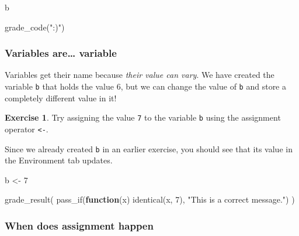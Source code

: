\documentclass[
]{article}
\newenvironment{Shaded}{\begin{snugshade}}{\end{snugshade}}
\newcommand{\ControlFlowTok}[1]{\textcolor[rgb]{0.13,0.29,0.53}{\textbf{#1}}}
\newcommand{\DecValTok}[1]{\textcolor[rgb]{0.00,0.00,0.81}{#1}}
\newcommand{\FunctionTok}[1]{\textcolor[rgb]{0.00,0.00,0.00}{#1}}
\newcommand{\NormalTok}[1]{#1}
\newcommand{\OtherTok}[1]{\textcolor[rgb]{0.56,0.35,0.01}{#1}}
\newcommand{\StringTok}[1]{\textcolor[rgb]{0.31,0.60,0.02}{#1}}
\theoremstyle{definition}
\theoremstyle{definition}
\theoremstyle{definition}
\newtheorem{exercise}{Exercise}[section]
\theoremstyle{definition}
\theoremstyle{remark}
\begin{document}
\begin{Shaded}
\begin{Highlighting}[]
\NormalTok{b}
\end{Highlighting}
\end{Shaded}

\begin{Shaded}
\begin{Highlighting}[]
\FunctionTok{grade\_code}\NormalTok{(}\StringTok{":)"}\NormalTok{)}
\end{Highlighting}
\end{Shaded}

\hypertarget{variables-are-variable}{%
\subsubsection{Variables are\ldots{} variable}\label{variables-are-variable}}

Variables get their name because \emph{their value can vary}. We have created the variable \texttt{b} that holds the value 6, but we can change the value of \texttt{b} and store a completely different value in it!

\begin{exercise}
Try assigning the value \texttt{7} to the variable \texttt{b} using the assignment operator \texttt{\textless{}-}.

Since we already created \texttt{b} in an earlier exercise, you should see that its value in the Environment tab updates.
\end{exercise}

\begin{Shaded}
\begin{Highlighting}[]
\NormalTok{b }\OtherTok{\textless{}{-}} \DecValTok{7}
\end{Highlighting}
\end{Shaded}

\begin{Shaded}
\begin{Highlighting}[]
\FunctionTok{grade\_result}\NormalTok{(}
  \FunctionTok{pass\_if}\NormalTok{(}\ControlFlowTok{function}\NormalTok{(x) }\FunctionTok{identical}\NormalTok{(x, }\DecValTok{7}\NormalTok{), }\StringTok{"This is a correct message."}\NormalTok{)}
\NormalTok{)}
\end{Highlighting}
\end{Shaded}

\hypertarget{when-does-assignment-happen}{%
\subsubsection{When does assignment happen}\label{when-does-assignment-happen}}
\end{document}
